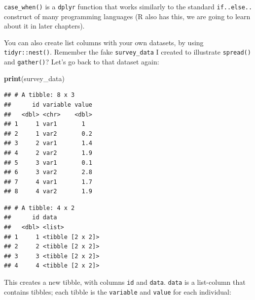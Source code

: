 \documentclass[]{gitbook}
\newenvironment{Shaded}{\begin{snugshade}}{\end{snugshade}}
\newcommand{\KeywordTok}[1]{\textcolor[rgb]{0.13,0.29,0.53}{\textbf{#1}}}
\newcommand{\NormalTok}[1]{#1}
\newcommand{\OperatorTok}[1]{\textcolor[rgb]{0.81,0.36,0.00}{\textbf{#1}}}
\newcommand{\StringTok}[1]{\textcolor[rgb]{0.31,0.60,0.02}{#1}}
\theoremstyle{definition}
\theoremstyle{definition}
\theoremstyle{definition}
\theoremstyle{remark}
\begin{document}
\texttt{case\_when()} is a \texttt{dplyr} function that works similarly
to the standard \texttt{if..else..} construct of many programming
languages (R also has this, we are going to learn about it in later
chapters).

You can also create list columns with your own datasets, by using
\texttt{tidyr::nest()}. Remember the fake \texttt{survey\_data} I
created to illustrate \texttt{spread()} and \texttt{gather()}? Let's go
back to that dataset again:

\begin{Shaded}
\begin{Highlighting}[]
\KeywordTok{print}\NormalTok{(survey_data)}
\end{Highlighting}
\end{Shaded}

\begin{verbatim}
## # A tibble: 8 x 3
##      id variable value
##   <dbl> <chr>    <dbl>
## 1     1 var1       1  
## 2     1 var2       0.2
## 3     2 var1       1.4
## 4     2 var2       1.9
## 5     3 var1       0.1
## 6     3 var2       2.8
## 7     4 var1       1.7
## 8     4 var2       1.9
\end{verbatim}

\begin{Shaded}
\end{Shaded}

\begin{verbatim}
## # A tibble: 4 x 2
##      id data            
##   <dbl> <list>          
## 1     1 <tibble [2 x 2]>
## 2     2 <tibble [2 x 2]>
## 3     3 <tibble [2 x 2]>
## 4     4 <tibble [2 x 2]>
\end{verbatim}

This creates a new tibble, with columns \texttt{id} and \texttt{data}.
\texttt{data} is a list-column that contains tibbles; each tibble is the
\texttt{variable} and \texttt{value} for each individual:

\begin{Shaded}
\end{Shaded}
\end{document}
